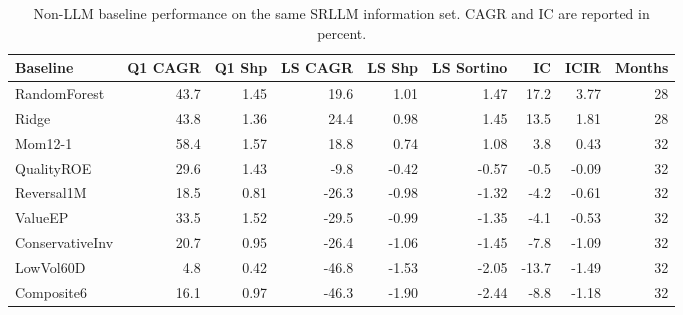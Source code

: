 \begin{table}[t]
\centering
\caption{Non-LLM baseline performance on the same SRLLM information set. CAGR and IC are reported in percent.}
\label{tab:nonllm-baselines}
\small
\begin{tabular}{lrrrrrrrr}
\toprule
Baseline & Q1 CAGR & Q1 Shp & LS CAGR & LS Shp & LS Sortino & IC & ICIR & Months \\
\midrule
RandomForest & 43.7 & 1.45 & 19.6 & 1.01 & 1.47 & 17.2 & 3.77 & 28 \\
Ridge & 43.8 & 1.36 & 24.4 & 0.98 & 1.45 & 13.5 & 1.81 & 28 \\
Mom12-1 & 58.4 & 1.57 & 18.8 & 0.74 & 1.08 & 3.8 & 0.43 & 32 \\
QualityROE & 29.6 & 1.43 & -9.8 & -0.42 & -0.57 & -0.5 & -0.09 & 32 \\
Reversal1M & 18.5 & 0.81 & -26.3 & -0.98 & -1.32 & -4.2 & -0.61 & 32 \\
ValueEP & 33.5 & 1.52 & -29.5 & -0.99 & -1.35 & -4.1 & -0.53 & 32 \\
ConservativeInv & 20.7 & 0.95 & -26.4 & -1.06 & -1.45 & -7.8 & -1.09 & 32 \\
LowVol60D & 4.8 & 0.42 & -46.8 & -1.53 & -2.05 & -13.7 & -1.49 & 32 \\
Composite6 & 16.1 & 0.97 & -46.3 & -1.90 & -2.44 & -8.8 & -1.18 & 32 \\
\bottomrule
\end{tabular}
\end{table}
